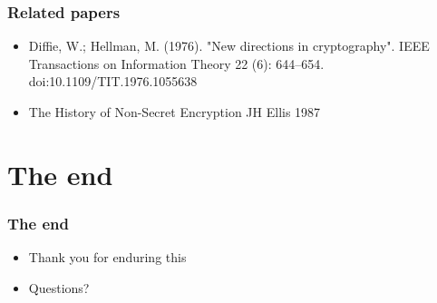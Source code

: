 \documentclass{beamer}
\begin{document}
\begin{frame}
	\frametitle{Related papers}

	\begin{itemize}
		\item Diffie, W.; Hellman, M. (1976). "New directions in
		      cryptography". IEEE Transactions on Information Theory 22 
		      (6): 644–654. doi:10.1109/TIT.1976.1055638
		\item The History of Non-Secret Encryption JH Ellis 1987
	\end{itemize}
\end{frame}

\section{The end}

\begin{frame}
	\frametitle{The end}

	\begin{itemize}
		\item Thank you for enduring this
		\item Questions?
	\end{itemize}
\end{frame}
\end{document}
